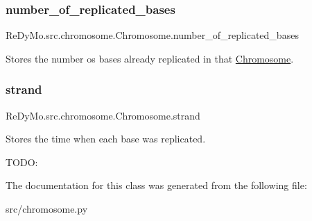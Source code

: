 \subsubsection{\texorpdfstring{number\+\_\+of\+\_\+replicated\+\_\+bases}{number\_of\_replicated\_bases}}
{\footnotesize\ttfamily Re\+Dy\+Mo.\+src.\+chromosome.\+Chromosome.\+number\+\_\+of\+\_\+replicated\+\_\+bases}



Stores the number os bases already replicated in that \mbox{\hyperlink{classReDyMo_1_1src_1_1chromosome_1_1Chromosome}{Chromosome}}. 

\mbox{\label{classReDyMo_1_1src_1_1chromosome_1_1Chromosome_ad6b5e4f18b081ac4cf8271d1ec216141}} 
\subsubsection{\texorpdfstring{strand}{strand}}
{\footnotesize\ttfamily Re\+Dy\+Mo.\+src.\+chromosome.\+Chromosome.\+strand}



Stores the time when each base was replicated. 

T\+O\+DO\+: 

The documentation for this class was generated from the following file\+:\begin{DoxyCompactItemize}
\item 
src/chromosome.\+py\end{DoxyCompactItemize}
